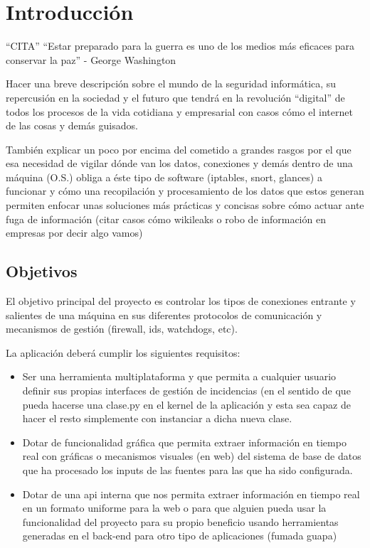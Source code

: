 \chapter{Introducción}
\label{chap:introducción}

``CITA''
``Estar preparado para la guerra es uno de los medios más eficaces para conservar la paz'' - George Washington

Hacer una breve descripción sobre el mundo de la seguridad informática, su repercusión en la sociedad y el futuro que tendrá en la revolución ``digital'' de todos los procesos de la vida cotidiana y empresarial con casos cómo el internet de las cosas y demás guisados.

También explicar un poco por encima del cometido a grandes rasgos por el que esa necesidad de vigilar dónde van los datos, conexiones y demás dentro de una máquina (O.S.) obliga a éste tipo de software (iptables, snort, glances) a funcionar y cómo una recopilación y procesamiento de los datos que estos generan permiten enfocar unas soluciones más prácticas y concisas sobre cómo actuar ante fuga de información (citar casos cómo wikileaks o robo de información en empresas por decir algo vamos)

\section{Objetivos}

El objetivo principal del proyecto es controlar los tipos de conexiones entrante y salientes de una máquina en sus diferentes protocolos de comunicación y mecanismos de gestión (firewall, ids, watchdogs, etc).

La aplicación deberá cumplir los siguientes requisitos:

\begin{itemize}
\item Ser una herramienta multiplataforma y que permita a cualquier usuario definir sus propias interfaces de gestión de incidencias (en el sentido de que pueda hacerse una clase.py en el kernel de la aplicación y esta sea capaz de hacer el resto simplemente con instanciar a dicha nueva clase.
\item Dotar de funcionalidad gráfica que permita extraer información en tiempo real con gráficas o mecanismos visuales (en web) del sistema de base de datos que ha procesado los inputs de las fuentes para las que ha sido configurada.
\item Dotar de una api interna que nos permita extraer información en tiempo real en un formato uniforme para la web o para que alguien pueda usar la funcionalidad del proyecto para su propio beneficio usando herramientas generadas en el back-end para otro tipo de aplicaciones (fumada guapa)
\end{itemize}


